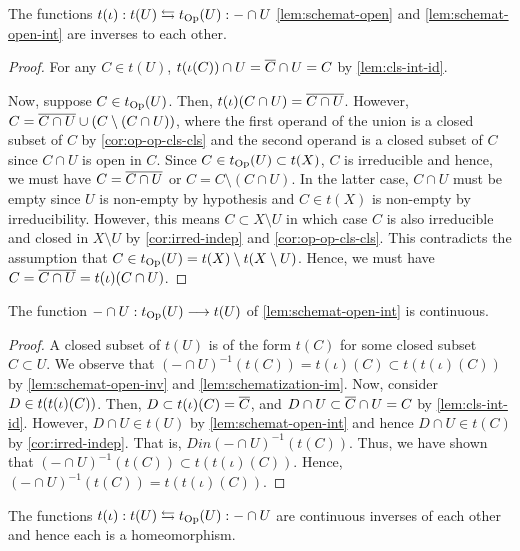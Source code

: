 \begin{lem}\label{lem:schemat-open-inv}
The functions $t(\iota) : t(U) \leftrightarrows t_{\mathrm{Op}}(U) : - \cap U$
\cref{lem:schemat-open} and \cref{lem:schemat-open-int}
are inverses to each other.
\end{lem}
\begin{proof}
For any $C \in t(U)$, $t(\iota(C)) \cap U = \cls{C} \cap U = C$ by
\cref{lem:cls-int-id}.

Now, suppose $C \in t_{\mathrm{Op}}(U)$. Then, $t(\iota)(C \cap U) = \cls{C \cap U}$.
However, $C = \cls{C \cap U} \cup (C \setminus (C \cap U))$,
where the first operand of the union is a closed subset of $C$ by
\cref{cor:op-op-cls-cls} and the second operand is a closed subset of $C$
since $C \cap U$ is open in $C$. Since $C \in t_{\mathrm{Op}}(U) \subset t(X)$, $C$
is irreducible and hence, we must have $C = \cls{C \cap U}$ or
$C = C \setminus (C \cap U)$. In the latter case, $C \cap U$ must be
empty since $U$ is non-empty by hypothesis and $C \in t(X)$ is non-empty by
irreducibility. However, this means $C \subset X \setminus U$ in which
case $C$ is also irreducible and closed in $X \setminus U$ by
\cref{cor:irred-indep} and \cref{cor:op-op-cls-cls}. This contradicts
the assumption that $C \in t_{\mathrm{Op}}(U) = t(X) \setminus t(X \setminus U)$.
Hence, we must have $C = \cls{C \cap U} = t(\iota)(C \cap U)$.
\end{proof}

\begin{lem}
The function $- \cap U : t_\Op(U) \to t(U)$
of \cref{lem:schemat-open-int} is continuous.
\end{lem}
\begin{proof}
A closed subset of $t(U)$ is of the form $t(C)$ for some closed subset
$C \subset U$. We observe that
$(- \cap U)^{-1}(t(C)) = t(\iota)(C) \subset t(t(\iota)(C))$
by \cref{lem:schemat-open-inv} and \cref{lem:schematization-im}.
Now, consider $D \in t\br{t(\iota)(C)}$. Then,
$D \subset t(\iota)(C) = \cls{C}$, and $D \cap U \subset \cls{C} \cap U = C$
by \cref{lem:cls-int-id}. However, $D \cap U \in t(U)$ by
\cref{lem:schemat-open-int} and hence $D \cap U \in t(C)$ by
\cref{cor:irred-indep}. That is, $D in (- \cap U)^{-1}(t(C))$.
Thus, we have shown that $(- \cap U)^{-1}(t(C)) \subset t(t(\iota)(C))$.
Hence, $(- \cap U)^{-1}(t(C)) = t(t(\iota)(C))$.
\end{proof}

\begin{thm}\label{thm:schemat-open-homeo}
The functions $t(\iota) : t(U) \leftrightarrows t_{\mathrm{Op}}(U) : - \cap U$
are continuous inverses of each other and hence each is a homeomorphism.
\end{thm}
